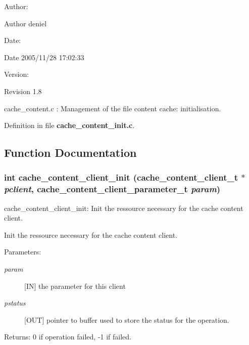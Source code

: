 \begin{Desc}
\item[Author:]\begin{Desc}
\item[Author]deniel \end{Desc}
\end{Desc}
\begin{Desc}
\item[Date:]\begin{Desc}
\item[Date]2005/11/28 17:02:33 \end{Desc}
\end{Desc}
\begin{Desc}
\item[Version:]\begin{Desc}
\item[Revision]1.8 \end{Desc}
\end{Desc}
cache\_\-content.c : Management of the file content cache: initialisation.

Definition in file {\bf cache\_\-content\_\-init.c}.

\subsection{Function Documentation}
\subsubsection{\setlength{\rightskip}{0pt plus 5cm}int cache\_\-content\_\-client\_\-init (cache\_\-content\_\-client\_\-t $\ast$ {\em pclient}, cache\_\-content\_\-client\_\-parameter\_\-t {\em param})}\label{cache__content__init_8c_a2}


cache\_\-content\_\-client\_\-init: Init the ressource necessary for the cache content client.

Init the ressource necessary for the cache content client.

\begin{Desc}
\item[Parameters:]
\begin{description}
\item[{\em param}][IN] the parameter for this client \item[{\em pstatus}][OUT] pointer to buffer used to store the status for the operation.\end{description}
\end{Desc}
\begin{Desc}
\item[Returns:]0 if operation failed, -1 if failed. \end{Desc}


